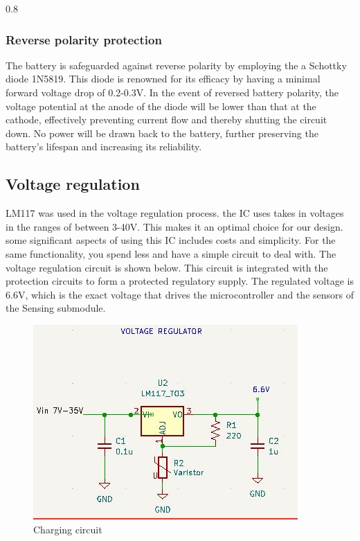 \documentclass[class=report,11pt,crop=false]{standalone}
\begin{document}
\begin{table}[h!]
\begin{tabularx}{0.8\textwidth}
{{	\subsubsection{Reverse polarity protection}
	\vspace{0.5cm}
	
	The battery is safeguarded against reverse polarity by employing the a Schottky diode 1N5819. This diode is renowned for its efficacy by having a minimal forward voltage drop of 0.2-0.3V. In the event of reversed battery polarity, the voltage potential at the anode of the diode will be lower than that at the cathode, effectively preventing current flow and thereby shutting the circuit down. No power will be drawn back to the battery, further preserving the battery's lifespan and increasing its reliability.
	
	
	\subsection{Voltage regulation}
	LM117 was used in the voltage regulation process. the IC uses takes in voltages in the ranges of between 3-40V. This makes it an optimal choice for our design. some significant aspects of using this IC includes costs and simplicity. For the same functionality, you spend less and have a simple circuit to deal with. The voltage regulation circuit is shown below. This circuit is integrated with the protection circuits to form a protected regulatory supply. The regulated voltage is 6.6V, which is the exact voltage that drives the microcontroller and the sensors of the Sensing submodule.  
	
	\begin{figure}[h!]
		\centering
		\includegraphics[width=0.9\linewidth]{Figures/regulator.jpg}
		\caption{Charging circuit}
		\label{fig: P1}
	\end{figure}
	
}}
\end{tabularx}
\end{table}
\end{document}
